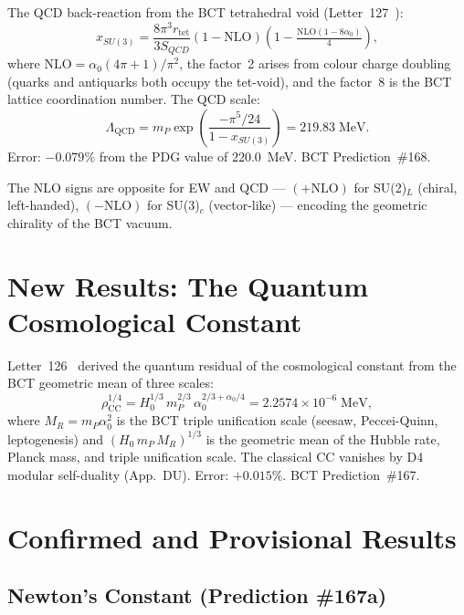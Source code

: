 \documentclass[aps,prl,twocolumn,showpacs,preprintnumbers]{revtex4-2}
\newcommand{\rtet}{r_{\mathrm{tet}}}
\newcommand{\azero}{\alpha_0}
\newcommand{\mP}{m_P}
\newcommand{\LQCD}{\Lambda_{\mathrm{QCD}}}
\newcommand{\NLO}{\mathrm{NLO}}
\newcommand{\rhoCC}{\rho_{\mathrm{CC}}}
\newcommand{\MR}{M_R}
\begin{document}
The QCD back-reaction from the BCT tetrahedral void
(Letter~127~\cite{letter127}):
\begin{equation}
  x_{SU(3)} = \frac{8\pi^3\rtet}{3S_{QCD}}
  (1-\NLO)\!\left(1 - \tfrac{\NLO(1-8\azero)}{4}\right),
  \label{eq:xSU3}
\end{equation}
where $\NLO = \azero(4\pi+1)/\pi^2$,
the factor~2 arises from colour charge doubling (quarks and
antiquarks both occupy the tet-void), and the factor~8 is the
BCT lattice coordination number.
The QCD scale:
\begin{equation}
  \LQCD = \mP\exp\!\left(\frac{-\pi^5/24}{1-x_{SU(3)}}\right)
  = 219.83\;\text{MeV}.
  \label{eq:LQCD}
\end{equation}
Error: $-0.079\%$ from the PDG value of $220.0$~MeV.
BCT Prediction~\#168.

The NLO signs are opposite for EW and QCD --- $(+\NLO)$ for
SU(2)$_L$ (chiral, left-handed), $(-\NLO)$ for SU(3)$_c$
(vector-like) --- encoding the geometric chirality of the BCT vacuum.

\section{New Results: The Quantum Cosmological Constant}

Letter~126~\cite{letter126} derived the quantum residual of the
cosmological constant from the BCT geometric mean of three scales:
\begin{equation}
  \rhoCC^{1/4} = H_0^{1/3}\,\mP^{2/3}\,\azero^{2/3+\azero/4}
  = 2.2574\times10^{-6}\;\text{MeV},
  \label{eq:CC}
\end{equation}
where $\MR = \mP\azero^2$ is the BCT triple unification scale
(seesaw, Peccei-Quinn, leptogenesis) and
$(H_0\,\mP\,\MR)^{1/3}$ is the geometric mean of the Hubble
rate, Planck mass, and triple unification scale.
The classical CC vanishes by D4 modular self-duality (App.~DU).
Error: $+0.015\%$. BCT Prediction~\#167.

\section{Confirmed and Provisional Results}

\subsection{Newton's Constant (Prediction \#167a)}
\end{document}
